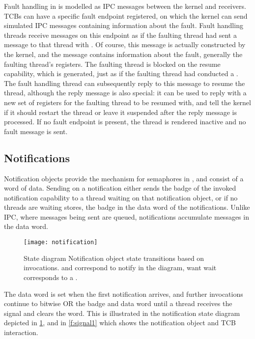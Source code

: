 Fault handling in \selfour is modelled as IPC messages between the kernel and receivers. 
\glspl{TCB} can have a specific fault endpoint registered, on which the kernel can send simulated
\gls{IPC} messages containing information about the fault. Fault handling threads receive messages
on this endpoint as if the faulting thread had sent a message to that thread with . Of
course, this message is actually constructed by the kernel, and the message contains information
about the fault, generally the faulting thread's registers. The faulting thread is blocked on the
resume capability, which is generated, just as if the faulting thread had conducted a .
The fault handling thread can subsequently reply to this message to
resume the thread, although the reply message is also special: it can be used to reply with a new
set of registers for the faulting thread to be resumed with, and tell the kernel if it should
restart the thread or leave it suspended after the reply message is processed.
If no fault endpoint is present, the
thread is rendered inactive and no fault message is sent. 

\subsection{Notifications}
\label{p:sel4_notifications}

Notification objects provide the mechanism for semaphores in \selfour, and consist of a word of
data. Sending on a notification either sends the badge of the invoked notification capability to a 
thread waiting on that notification object, or if no threads are waiting stores, the badge in the
data word of the notifications. Unlike IPC, where messages being sent are queued, notifications
accumulate messages in the data word.

\begin{figure}
    \centering
    \texttt{[image: notification]}
    \caption{State diagram Notification object state transitions based on invocations.  and
     correspond to notify in the diagram, want wait corresponds to a .}
    \label{f:notification}
\end{figure}

The data word is set when the first notification arrives, and further invocations continue to bitwise OR the badge and data word
until a thread receives the signal and clears the word. This is illustrated in the notification
state diagram depicted in \cref{f:notification}, and in \cref{f:signal1} which shows the
notification object and TCB interaction.

